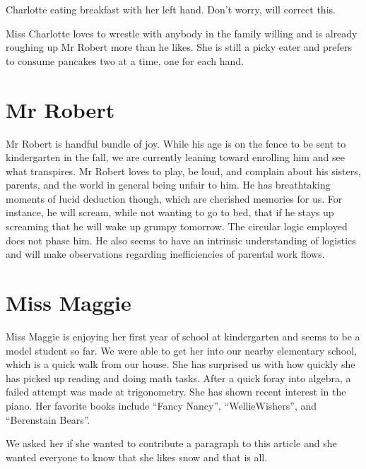 \documentclass[letterpaper,11pt]{article}
\makeatletter
\newenvironment{figurehere}
  {\def\@captype{figure}}
  {}
\makeatother
\begin{document}
\begin{multicols}{2}
\bigskip

\begin{figurehere}
 \centering   
 \caption{Charlotte eating breakfast with her left hand. Don't worry, will correct this.}
\end{figurehere}

\bigskip

Miss Charlotte loves to wrestle with anybody in the family willing and is already
roughing up Mr Robert more than he likes.  She is still a picky eater and prefers
to consume pancakes two at a time, one for each hand.

\section{Mr Robert}

Mr Robert is handful bundle of joy.  While his age is on the fence to be sent
to kindergarten in the fall, we are currently leaning toward enrolling him and
see what transpires. Mr Robert loves to play, be loud, and complain about his sisters,
parents, and the world in general being unfair to him.  He has breathtaking moments of
lucid deduction though, which are cherished memories for us.  For instance, he will
scream, while not wanting to go to bed, that if he stays up screaming that he will 
wake up grumpy tomorrow. The circular logic employed does not phase him.
He also seems to have an intrinsic understanding of
logistics and will make observations regarding inefficiencies of parental
work flows.

\section{Miss Maggie}

Miss Maggie is enjoying her first year of school at kindergarten and seems to be
a model student so far.  We were able to get her into our nearby elementary school,
which is a quick walk from our house.  She has surprised us with how quickly she
has picked up reading and doing math tasks.  After a quick foray into algebra,
a failed attempt was made at trigonometry.  She has shown recent interest in
the piano. Her favorite books include
\enquote{Fancy Nancy}, \enquote{WellieWishers\texttrademark}, and
\enquote{Berenstain Bears}.

We asked her if she wanted to contribute a paragraph to this article and she wanted
everyone to know that she likes snow and that is all.


\end{multicols}
\end{document}
